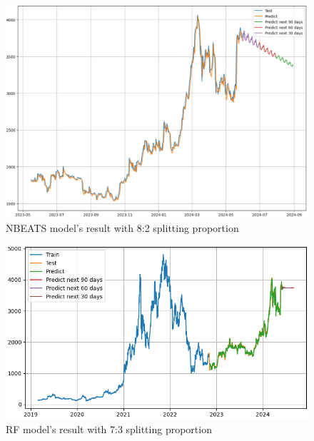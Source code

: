 \documentclass{ieeeojies}
\begin{document}
\begin{figure}[H]
	\centering
	\begin{minipage}{0.6\linewidth}
		\centering
		\includegraphics[width=\linewidth]{bibliography/Images/NBEATS_ETH_82.PNG}
		\caption{NBEATS model's result with 8:2 splitting proportion}
	\end{minipage}
\end{figure}
\begin{figure}[H]
	\centering
	\begin{minipage}{0.6\linewidth}
		\centering
		\includegraphics[width=\linewidth]{bibliography/Images/RF_ETH_73.PNG}
		\caption{RF model's result with 7:3 splitting proportion}
	\end{minipage}
\end{figure}
\end{document}
